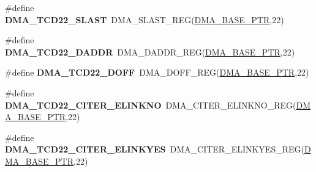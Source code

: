\begin{DoxyCompactItemize}
\item 
\hypertarget{group___d_m_a___register___accessor___macros_ga21a8ae69cc8cbe98ef9f067067e6a2f3}{}\#define {\bfseries D\+M\+A\+\_\+\+T\+C\+D22\+\_\+\+S\+L\+A\+S\+T}~D\+M\+A\+\_\+\+S\+L\+A\+S\+T\+\_\+\+R\+E\+G(\hyperlink{group___d_m_a___peripheral_ga6997fbc1b1973e9f27170217a3bd6f22}{D\+M\+A\+\_\+\+B\+A\+S\+E\+\_\+\+P\+T\+R},22)\label{group___d_m_a___register___accessor___macros_ga21a8ae69cc8cbe98ef9f067067e6a2f3}

\item 
\hypertarget{group___d_m_a___register___accessor___macros_gaeca99eca2986b52153702316deef9d04}{}\#define {\bfseries D\+M\+A\+\_\+\+T\+C\+D22\+\_\+\+D\+A\+D\+D\+R}~D\+M\+A\+\_\+\+D\+A\+D\+D\+R\+\_\+\+R\+E\+G(\hyperlink{group___d_m_a___peripheral_ga6997fbc1b1973e9f27170217a3bd6f22}{D\+M\+A\+\_\+\+B\+A\+S\+E\+\_\+\+P\+T\+R},22)\label{group___d_m_a___register___accessor___macros_gaeca99eca2986b52153702316deef9d04}

\item 
\hypertarget{group___d_m_a___register___accessor___macros_ga4f12925b4de88a59b3fc1e5324512081}{}\#define {\bfseries D\+M\+A\+\_\+\+T\+C\+D22\+\_\+\+D\+O\+F\+F}~D\+M\+A\+\_\+\+D\+O\+F\+F\+\_\+\+R\+E\+G(\hyperlink{group___d_m_a___peripheral_ga6997fbc1b1973e9f27170217a3bd6f22}{D\+M\+A\+\_\+\+B\+A\+S\+E\+\_\+\+P\+T\+R},22)\label{group___d_m_a___register___accessor___macros_ga4f12925b4de88a59b3fc1e5324512081}

\item 
\hypertarget{group___d_m_a___register___accessor___macros_ga8b73c5a061bfd3f5255c257e016a0ca0}{}\#define {\bfseries D\+M\+A\+\_\+\+T\+C\+D22\+\_\+\+C\+I\+T\+E\+R\+\_\+\+E\+L\+I\+N\+K\+N\+O}~D\+M\+A\+\_\+\+C\+I\+T\+E\+R\+\_\+\+E\+L\+I\+N\+K\+N\+O\+\_\+\+R\+E\+G(\hyperlink{group___d_m_a___peripheral_ga6997fbc1b1973e9f27170217a3bd6f22}{D\+M\+A\+\_\+\+B\+A\+S\+E\+\_\+\+P\+T\+R},22)\label{group___d_m_a___register___accessor___macros_ga8b73c5a061bfd3f5255c257e016a0ca0}

\item 
\hypertarget{group___d_m_a___register___accessor___macros_gaa67fed4410baa32ad3edd4fdcb432e5b}{}\#define {\bfseries D\+M\+A\+\_\+\+T\+C\+D22\+\_\+\+C\+I\+T\+E\+R\+\_\+\+E\+L\+I\+N\+K\+Y\+E\+S}~D\+M\+A\+\_\+\+C\+I\+T\+E\+R\+\_\+\+E\+L\+I\+N\+K\+Y\+E\+S\+\_\+\+R\+E\+G(\hyperlink{group___d_m_a___peripheral_ga6997fbc1b1973e9f27170217a3bd6f22}{D\+M\+A\+\_\+\+B\+A\+S\+E\+\_\+\+P\+T\+R},22)\label{group___d_m_a___register___accessor___macros_gaa67fed4410baa32ad3edd4fdcb432e5b}


\end{DoxyCompactItemize}
